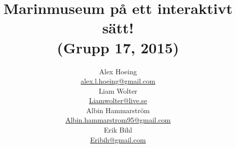 \title{
  Marinmuseum på ett interaktivt sätt!\\
  (Grupp 17, 2015)\\
}

\author{
  Alex Hoeing\\
  \url{alex.l.hoeing@gmail.com}\\
  Liam Wolter\\
  \url{Liamwolter@live.se}\\
  Albin Hammarström\\
  \url{Albin.hammarstrom95@gmail.com}\\
  Erik Bihl\\
  \url{Eribih@gmail.com}\\
}

\date {}
